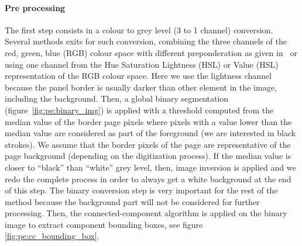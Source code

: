 \paragraph{Pre processing} %
\label{par:process}

The first step consists in a colour to grey level (3 to 1 channel) conversion.
Several methods exits for such conversion, combining the three channels of the red, green, blue (RGB) colour space with different preponderation as given in~\cite{Pratt91} or using one channel from the Hue Saturation Lightness (HSL) or Value (HSL) representation of the RGB colour space.
Here we use the lightness channel because the panel border is usually darker than other element in the image, including the background. 
Then, a global binary segmentation (figure~\ref{fig:pe:binary_img}) is applied with a threshold computed from the median value of the border page pixels where pixels with a value lower than the median value are considered as part of the foreground (we are interested in black strokes).
We assume that the border pixels of the page are representative of the page background (depending on the digitization process).
If the median value is closer to ``black'' than ``white'' grey level, then, image inversion is applied and we redo the complete process in order to always get a white background at the end of this step.
The binary conversion step is very important for the rest of the method because the background part will not be considered for further processing. %
Then, the connected-component algorithm is applied on the binary image to extract component bounding boxes, see figure \ref{fig:pe:cc_bounding_box}.

